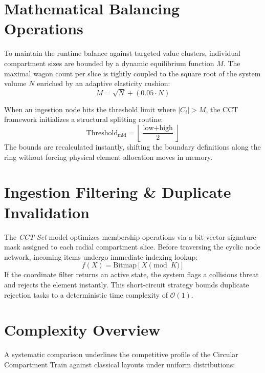 \documentclass[11pt,a4paper]{article}
\begin{document}
\section{Mathematical Balancing Operations}
To maintain the runtime balance against targeted value clusters, individual compartment sizes are bounded by a dynamic equilibrium function $M$. The maximal wagon count per slice is tightly coupled to the square root of the system volume $N$ enriched by an adaptive elasticity cushion:
\begin{equation}
    M = \sqrt{N} + (0.05 \cdot N)
\end{equation}

When an ingestion node hits the threshold limit where $|C_i| > M$, the CCT framework initializes a structural splitting routine:
\begin{equation}
    \text{Threshold}_{\text{mid}} = \left\lfloor \frac{\text{low} + \text{high}}{2} \right\rfloor
\end{equation}
The bounds are recalculated instantly, shifting the boundary definitions along the ring without forcing physical element allocation moves in memory.

\section{Ingestion Filtering \& Duplicate Invalidation}
The \textit{CCT-Set} model optimizes membership operations via a bit-vector signature mask assigned to each radial compartment slice. Before traversing the cyclic node network, incoming items undergo immediate indexing lookup:
\begin{equation}
    f(X) = \text{Bitmap}[X \pmod K]
\end{equation}
If the coordinate filter returns an active state, the system flags a collisions threat and rejects the element instantly. This short-circuit strategy bounds duplicate rejection tasks to a deterministic time complexity of $\mathcal{O}(1)$.

\section{Complexity Overview}
A systematic comparison underlines the competitive profile of the Circular Compartment Train against classical layouts under uniform distributions:
\end{document}
